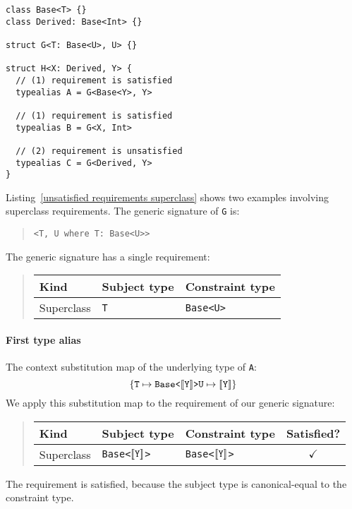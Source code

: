 \documentclass[../generics]{subfiles}
\begin{document}
\begin{listing}\label{unsatisfied requirements superclass}
\begin{Verbatim}
class Base<T> {}
class Derived: Base<Int> {}

struct G<T: Base<U>, U> {}

struct H<X: Derived, Y> {
  // (1) requirement is satisfied
  typealias A = G<Base<Y>, Y>

  // (1) requirement is satisfied
  typealias B = G<X, Int>

  // (2) requirement is unsatisfied
  typealias C = G<Derived, Y>
}
\end{Verbatim}
\end{listing}
\begin{example}
Listing~\ref{unsatisfied requirements superclass} shows two examples involving superclass requirements. The generic signature of \texttt{G} is:
\begin{quote}
\begin{verbatim}
<T, U where T: Base<U>>
\end{verbatim}
\end{quote}
The generic signature has a single requirement:
\begin{quote}
\begin{tabular}{|l|l|l|}
\hline
Kind&Subject type&Constraint type\\
\hline
Superclass&\texttt{T}&\texttt{Base<U>}\\
\hline
\end{tabular}
\end{quote}

\paragraph{First type alias} The context substitution map of the underlying type of \texttt{A}:
\[
\{
\texttt{T} \mapsto \texttt{Base<$[\![\texttt{Y}]\!]$>}\\
\texttt{U} \mapsto \texttt{$[\![\texttt{Y}]\!]$}
\}
\]
We apply this substitution map to the requirement of our generic signature:
\begin{quote}
\begin{tabular}{|l|l|l|c|}
\hline
Kind&Subject type&Constraint type&Satisfied?\\
\hline
Superclass&\texttt{Base<$[\![\texttt{Y}]\!]$>}&\texttt{Base<$[\![\texttt{Y}]\!]$>}&$\checkmark$\\
\hline
\end{tabular}
\end{quote}
The requirement is satisfied, because the subject type is canonical-equal to the constraint type.


\end{example}
\end{document}
